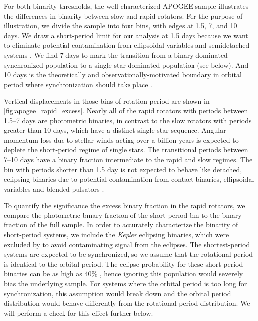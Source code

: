 \documentclass[manuscript]{aastex6}
\newcommand{\Kepler}{\mbox{\textit{Kepler}}}
\begin{document}
\begin{figure*}[htb]
    \centering
    \caption{\emph{Top Left to Bottom Right:} Vertical displacement of cool 
        APOGEE targets with \citet{McQuillan14} periods >10 days, between 
        7--10 days, 1.5--7 days, and <1.5 days. Pink stars denote 
        eclipsing binaries with orbital periods within the same ranges. The 
        green and purple lines denote the inclusive and conservative 
        photometric binary thresholds, respectively. The temperatures are from
    APOGEE.}\label{fig:apogee_rapid_excess}
\end{figure*}

For both binarity thresholds, the well-characterized APOGEE sample 
illustrates the differences in binarity between slow and rapid rotators. For
the purpose of illustration, we divide the sample into four bins, with edges at 
1.5, 7, and 10 days. We draw a short-period limit for our analysis at 1.5 days 
because we want to eliminate potential contamination from ellipsoidal variables 
and semidetached systems \citep{VanEylen16}. We find 7 days to mark the
transition from a binary-dominated synchronized population to a single-star
dominated population (see below). And 10 days is the theoretically and
observationally-motivated boundary in orbital period where synchronization
should take place \citep{Claret97,Lurie17}.

Vertical displacements in those bins of rotation period are shown in
\cref{fig:apogee_rapid_excess}. Nearly all of the rapid rotators with periods 
between 1.5--7 days are photometric binaries, in contrast to the slow rotators
with periods greater than 10 days, which have a distinct single star sequence. 
Angular momentum loss due to stellar winds acting over a billion years is
expected to deplete the short-period regime of single stars. The transitional 
periods between 7--10 days have a binary fraction intermediate to the 
rapid and slow regimes. The bin with periods shorter than 1.5 day is not expected
to behave like detached, eclipsing binaries due to potential contamination from 
contact binaries, ellipsoidal variables and blended pulsators \citep{VanEylen16}. 

To quantify the significance the excess binary fraction in the rapid rotators, 
we compare the photometric binary fraction of the short-period bin to the
binary fraction of the full sample. In order to accurately characterize the 
binarity of short-period systems, we include the \Kepler{} eclipsing binaries, 
which were excluded by \citet{McQuillan14} to avoid contaminating signal from 
the eclipses. The shortest-period systems are expected to be synchronized, so
we assume that the rotational period is identical to the orbital period. 
The eclipse probability for these short-period binaries can be as high as 40\% 
\citep{Kirk16}, hence ignoring this population would severely
bias the underlying sample. For systems where the orbital period is too long
for synchronization, this assumption would break down and the orbital period
distribution would behave differently from the rotational period distribution.
We will perform a check for this effect further below.
\end{document}
